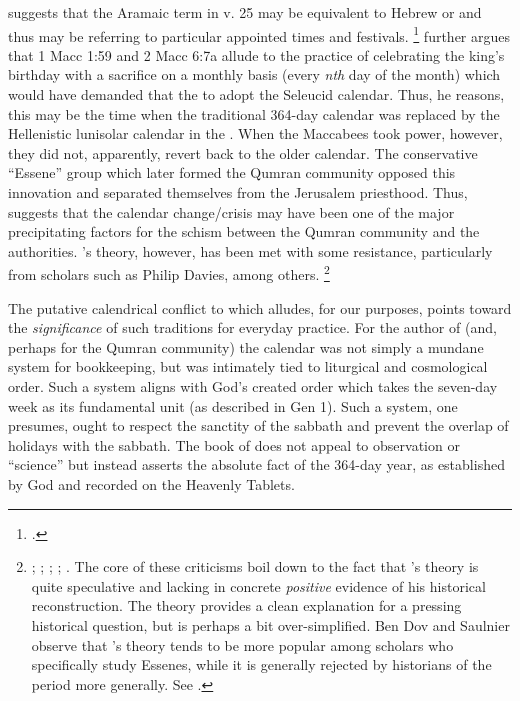 \noindent
\vanderkam suggests that the Aramaic term  in v. 25 may be equivalent to Hebrew  or  and thus may be referring to particular appointed times and festivals.%
    \footnote{\Cite[59--60]{vanderkam_jsj1981}.}
\vanderkam further argues that 1 Macc 1:59 and 2 Macc 6:7a allude to the practice of celebrating the king's birthday with a sacrifice on a monthly basis (every \emph{nth} day of the month) which would have demanded that the \jerusalemtemple to adopt the Seleucid calendar. Thus, he reasons, this may be the time when the traditional 364-day calendar was replaced by the Hellenistic lunisolar calendar in the \jerusalemtemple. When the Maccabees took power, however, they did not, apparently, revert back to the older calendar. The conservative ``Essene'' group which later formed the Qumran community opposed this innovation and separated themselves from the Jerusalem priesthood. Thus, \vanderkam suggests that the calendar change/crisis may have been one of the major precipitating factors for the schism between the Qumran community and the \jerusalemtemple authorities.\autocite[52]{vanderkam_jsj1981} \vanderkam's theory, however, has been met with some resistance, particularly from scholars such as Philip Davies, among others.%
    \footnote{%
        \cite{davies_cbq1983};
        \cite{wacholder-wacholder_huca1995};
        \cite{stern_lim-etal2000};
        \cite{stern_zpe2000};
        \cite[29 n. 136]{stern2001}.
        The core of these criticisms boil down to the fact that \vanderkam's theory is quite speculative and lacking in concrete \emph{positive} evidence of his historical reconstruction. The theory provides a clean explanation for a pressing historical question, but is perhaps a bit over-simplified. Ben Dov and Saulnier observe that \vanderkam's theory tends to be more popular among scholars who specifically study Essenes, while it is generally rejected by historians of the \secondtemple period more generally. See \cite[142]{bendov-saulnier_cbr2008}.}

The putative calendrical conflict to which \jub alludes, for our purposes, points toward the \emph{significance} of such traditions for everyday practice. For the author of \jub (and, perhaps for the Qumran community) the calendar was not simply a mundane system for bookkeeping, but was intimately tied to liturgical  and cosmological order. Such a system aligns with God's created order which takes the seven-day week as its fundamental unit (as described in Gen 1). Such a system, one presumes, ought to respect the sanctity of the sabbath and prevent the overlap of holidays with the sabbath. The book of \jub does not appeal to observation or ``science'' but instead asserts the absolute fact of the 364-day year, as established by God and recorded on the Heavenly Tablets. 

